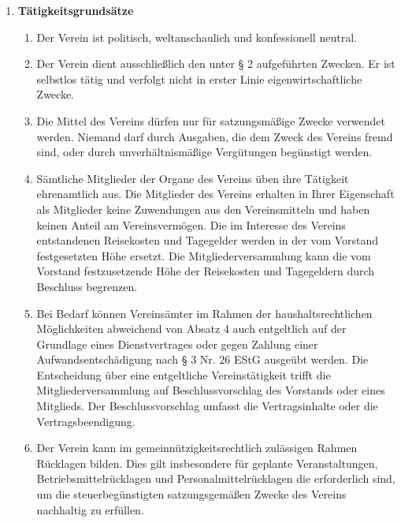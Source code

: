\documentclass{article}
\begin{document}
\begin{enumerate}[§ 1.]
\item \textsf{\textbf{Tätigkeitsgrundsätze}}
	\begin{enumerate}[1.]
	\item Der Verein ist politisch, weltanschaulich und konfessionell neutral.
	\item Der Verein dient ausschließlich den unter § 2 aufgeführten Zwecken. Er ist
selbstlos tätig und verfolgt nicht in erster Linie eigenwirtschaftliche Zwecke. 
	\item Die Mittel des Vereins dürfen nur für satzungsmäßige Zwecke verwendet werden.
Niemand darf durch Ausgaben, die dem Zweck des Vereins fremd sind, oder durch
unverhältnismäßige Vergütungen begünstigt werden.
	\item Sämtliche Mitglieder der Organe des Vereins üben ihre Tätigkeit ehrenamtlich aus.
Die Mitglieder des Vereins erhalten in Ihrer Eigenschaft als Mitglieder keine Zuwendungen aus den Vereinsmitteln
und haben keinen Anteil am Vereinsvermögen.
Die im Interesse des Vereins entstandenen Reisekosten und Tagegelder werden
in der vom Vorstand festgesetzten Höhe ersetzt.
Die Mitgliederversammlung kann die vom Vorstand festzusetzende Höhe der Reisekosten und Tagegeldern durch Beschluss begrenzen.
	\item Bei Bedarf können Vereinsämter im Rahmen der haushaltsrechtlichen Möglichkeiten abweichend von Absatz 4 auch entgeltlich auf der Grundlage eines Dienstvertrages oder gegen Zahlung einer Aufwandsentschädigung nach § 3 Nr. 26 EStG ausgeübt werden.
Die Entscheidung über eine entgeltliche Vereinstätigkeit trifft die Mitgliederversammlung auf Beschlussvorschlag des Vorstands oder eines Mitglieds.
Der Beschlussvorschlag umfasst die Vertragsinhalte oder die Vertragsbeendigung.
	\item Der Verein kann im gemeinnützigkeitsrechtlich zulässigen Rahmen Rücklagen bilden.
Dies gilt insbesondere für geplante Veranstaltungen, Betriebsmittelrücklagen und Personalmittelrücklagen die erforderlich sind, um die steuerbegünstigten satzungsgemäßen Zwecke des Vereins nachhaltig zu erfüllen.
	\end{enumerate}


\end{enumerate}
\end{document}
